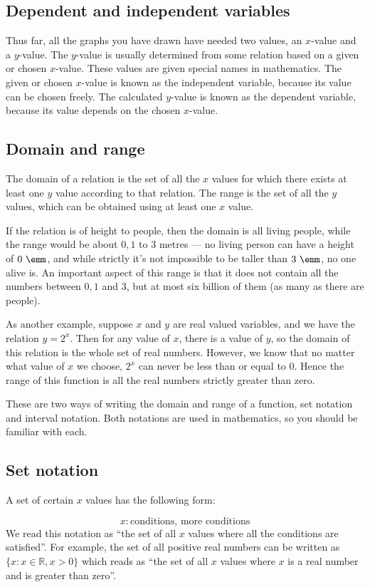 \subsection*{Dependent and independent variables}
\nopagebreak
Thus far, all the graphs you have drawn have needed two values, an $x$-value and a $y$-value. The $y$-value is usually determined from some relation based on a given or chosen $x$-value. These values are given special names in mathematics. The given or chosen $x$-value is known as the independent variable, because its value can be chosen freely. The calculated $y$-value is known as the dependent variable, because its value depends on the chosen $x$-value.\par 

\subsection*{Domain and range}
\nopagebreak
The domain of a relation is the set of all the $x$ values for which there exists at least one $y$ value according to that relation. The range is the set of all the $y$ values, which can be obtained using at least one $x$ value.\par 
If the relation is of height to people, then the domain is all living people, while the range would be about $0,1$ to $3$ metres --- no living person can have a height of $0~\emm$, and while strictly it's not impossible to be taller than $3~\emm$, no one alive is. An important aspect of this range is that it does not contain all the numbers between $0,1$ and $3$, but at most six billion of them (as many as there are people).\par 
As another example, suppose $x$ and $y$ are real valued variables, and we have the relation $y={2}^{x}$. Then for any value of $x$, there is a value of $y$, so the domain of this relation is the whole set of real numbers. However, we know that no matter what value of $x$ we choose, ${2}^{x}$ can never be less than or equal to $0$. Hence the range of this function is all the real numbers strictly greater than zero.\par 
These are two ways of writing the domain and range of a function, set notation and interval notation. Both notations are used in mathematics, so you should be familiar with each.\par 

\subsection*{Set notation}
\nopagebreak
A set of certain $x$ values has the following form:\par 
\nopagebreak\noindent{}
\begin{equation*}
x:\mbox{conditions, more conditions}
\end{equation*}
We read this notation as ``the set of all $x$ values where all the conditions are satisfied''. For example, the set of all positive real numbers can be written as $\{x:x\in \mathbb{R},x>0\}$ which reads as ``the set of all $x$ values where $x$ is a real number and is greater than zero''.\par 

